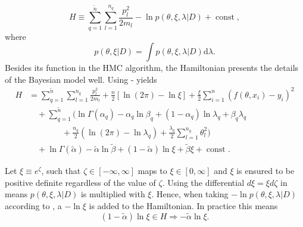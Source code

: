 \begin{equation}
	H \equiv  \sum_{q=1}^{\tilde{n}}\sum_{l=1}^{n_q}\frac{p_{l}^2}{2m_{l}}-\ln p(\theta,\xi,\lambda|D)+\operatorname{const},
	\label{eqh}
\end{equation}
where 
\begin{equation}
	p(\theta,\xi|D) = \int p(\theta,\xi,\lambda|D) \mathrm{d}\lambda.
	\label{eq:ss}
\end{equation}
Besides its function in the HMC algorithm, the Hamiltonian presents the details of the Bayesian model well. Using - yields
\begin{equation}
	\begin{split}
		H&=\sum_{q=1}^{\tilde{n}}\sum_{l=1}^{n_q}\frac{p_{l}^2}{2m_{l}}+\frac{n}{2}[\ln(2\pi)-\ln\xi] +\frac{\xi}{2}\sum_{i=1}^{n}(f(\theta,x_i)-y_i)^2\\
		&\quad+\sum_{q=1}^{\tilde{n}}\bigg(\ln\Gamma(\alpha_q)-\alpha_q\ln\beta_q+(1-\alpha_q)\ln\lambda_q+\beta_q\lambda_q\\
		&\qquad\qquad+\frac{n_q}{2}(\ln(2\pi)-\ln\lambda_q)+\frac{\lambda_q}{2}\sum_{l=1}^{n_q}\theta_l^2\bigg)\\
		&\quad+\ln\Gamma(\tilde{\alpha})-\tilde{\alpha}\ln\tilde{\beta}+(1-\tilde{\alpha})\ln\xi+\tilde{\beta}\xi+\operatorname{const}.
	\end{split}
	\label{eqh2}
\end{equation}

\begin{example}
	Let $\xi \equiv e^\zeta$, such that $\zeta\in [-\infty,\infty]$ maps to $\xi\in[0,\infty]$ and $\xi$ is ensured to be positive definite regardless of the value of $\zeta$. Using the differential $d\xi =  \xi d\zeta$ in  means $p(\theta,\xi,\lambda|D)$ is multiplied with $\xi$. Hence, when taking $-\ln p(\theta,\xi,\lambda|D)$ according to , a $-\ln\xi$ is added to the Hamiltonian. In practice this means
	\begin{equation}
		(1-\tilde{\alpha})\ln\xi\in H\Rightarrow -\tilde{\alpha}\ln\xi.
	\end{equation} 	
\end{example}

